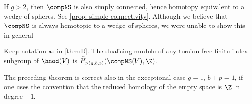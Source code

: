 \begin{rem}
If $g>2$, then $\compNS$ is also simply connected, hence homotopy equivalent to a wedge of spheres. See \cref{prop: simple connectivity}. Although we believe that $\compNS$ is always homotopic to a wedge of spheres, we were unable to show this in general.
\end{rem}

\begin{thmA}\label{thm:C} Keep notation as in \cref{thm:B}.
The dualising module of any torsion-free finite index subgroup of $\hmod(V)$ is $\widetilde H_{\nu(g,b,p)}(\compNS(V),\Z)$.
\end{thmA}

\begin{rem}
The preceding theorem is correct also in the exceptional case $g=1$, $b+p=1$, if one uses the convention that the reduced homology of the empty space is $\Z$ in degree $-1$.
\end{rem}
